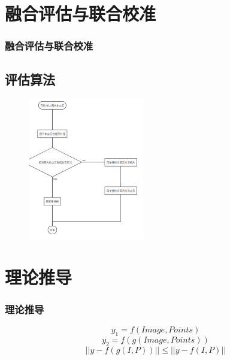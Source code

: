 \documentclass{beamer}
\begin{document}
\section{融合评估与联合校准}
\begin{frame}
  \frametitle{融合评估与联合校准}
  \subsection{评估算法}
          \begin{figure}[h]
    \centering
    \includegraphics[width=0.45\textwidth]{图片1.png}
    \end{figure}
\end{frame}


\section{理论推导}
\begin{frame}
  \frametitle{理论推导}
  \begin{equation}
    \label{eq:01}
    y_1=f(Image,Points)
  \end{equation}
  \begin{equation}
    \label{eq:02}
    y_2=f(g(Image,Points))
  \end{equation}
  \begin{equation}
    \label{eq:03}
  ||y-f(g(I,P))|| \leq ||y-f(I,P)||    
  \end{equation}

\end{frame}
\end{document}
